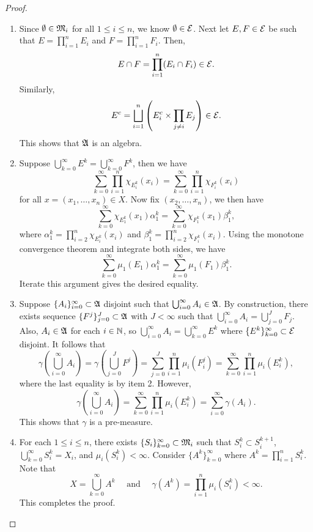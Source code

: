\documentclass[a4paper]{article}
\renewcommand{\cupinfi}{\bigcup_{i=0}^\infty}
\renewcommand{\suminfi}{\sum_{i=0}^\infty}
\renewcommand{\seqinfi}[1]{\{ #1 \}_{i=0}^\infty}
\renewcommand{\cupinfk}{\bigcup_{k=0}^\infty}
\renewcommand{\suminfk}{\sum_{k=0}^\infty}
\renewcommand{\seqinfk}[1]{\{ #1 \}_{k=0}^\infty}
\renewcommand{\cupj}{\bigcup_{j=0}}
\renewcommand{\sumj}{\sum_{j=0}}
\renewcommand{\seqj}[1]{\{ #1 \}_{j=0}}
\begin{document}
\begin{proof}
\begin{enumerate}
\item Since $\emptyset \in \mathfrak{M}_i$ for all $1 \leq i \leq n$,
we know $\emptyset \in \mathcal{E}$. Next let $E, F \in \mathcal{E}$ be
such that $E = \prod_{i=1}^n E_i$ and $F = \prod_{i=1}^n
F_i$. Then,
\[
E \cap F = \prod_{i=1}^n (E_i \cap F_i) \in \mathcal{E}.
\]
Similarly,
\[
E^c = \bigsqcup_{i=1}^n \left( E_i^c
\times \prod_{j \neq i} E_j \right) \in \mathcal{E}.
\]
This shows that $\mathfrak{A}$ is an algebra.

\item Suppose $\cupinfk E^k = \cupinfk F^k$, then we have
\[
\suminfk \prod_{i=1}^n \chi_{E_i^k}(x_i)
= \suminfk \prod_{i=1}^n \chi_{F_i^k}(x_i)
\]
for all $x = (x_1, \dots, x_n) \in X$.
Now fix $(x_2, \dots, x_n)$, we then have
\[
\suminfk \chi_{E^k_1}(x_1) \alpha_1^k
= \suminfk \chi_{F^k_1}(x_1) \beta_1^k,
\]
where
$\alpha_1^k = \prod_{i=2}^n \chi_{E_i^k} (x_i)$ and
$\beta_1^k = \prod_{i=2}^n \chi_{F_i^k} (x_i)$.
Using the monotone convergence theorem and integrate
both sides, we have
\[
\suminfk \mu_1(E_1) \alpha_1^k
= \suminfk \mu_1(F_1) \beta_1^k.
\]
Iterate this argument gives the desired equality.

\item Suppose $\seqinfi{A_i} \subset \afk$ disjoint such that
$\cupinfi A_i \in \afk$. By construction, there exists
sequence $\seqj{F^j}^J \subset \afk$ with $J < \infty$ such that
$\cupinfi{A_i} = \cupj^J F_j$. Also, $A_i \in \mathfrak{A}$
for each $i \in \mathbb{N}$, so $\cupinfi A_i = \cupinfk E^k$
where $\seqinfk{E^k} \subset \ecal$ disjoint.
It follows that
\[
\gamma \left( \cupinfi A_i \right)
= \gamma \left( \cupj^J F^j \right)
= \sumj^J \prod_{i=1}^n \mu_i ( F_i^j )
= \suminfk \prod_{i=1}^n \mu_i (E_i^k),
\]
where the last equality is by item 2. However,
\[
\gamma \left( \cupinfi A_i \right)
= \suminfk \prod_{i=1}^n \mu_i (E_i^k)
= \suminfi \gamma (A_i).
\]
This shows that $\gamma$ is a pre-measure.

\item For each $1 \leq i \leq n$, there exists
$\seqinfk{S_i} \subset \mf_i$ such that
$S_i^k \subset S_i^{k+1}$,
$\cupinfk S_i^k = X_i$, and $\mu_i(S_i^k) < \infty$.
Consider $\seqinfk{A^k}$ where $A^k = \prod_{i=1}^n S_i^k$.
Note that
\[
X = \cupinfk A^k \quad \text{ and } \quad
\gamma(A^k) = \prod_{i=1}^n \mu_i \left( S_i^k \right) < \infty.
\]
This completes the proof.

\end{enumerate}
\end{proof}
\end{document}
